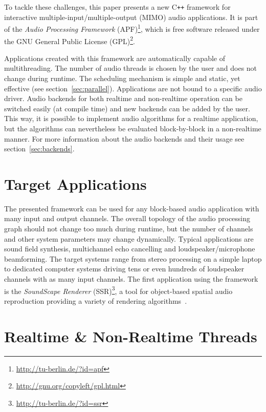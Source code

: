 \documentclass[11pt,letterpaper]{article}
\begin{document}
To tackle these challenges, this paper presents a new C\texttt{++} framework for interactive multiple-input/multiple-output (MIMO)
audio applications.
It is part of the \emph{Audio Processing Framework}
(APF)\footnote{\url{http://tu-berlin.de/?id=apf}}, which is free software
released under the GNU General Public License
(GPL)\footnote{\url{http://gnu.org/copyleft/gpl.html}}.

Applications created with this framework are automatically capable of
multithreading.
The number of audio threads is chosen by the user and does not change during
runtime.
The scheduling mechanism is simple and static, yet effective (see
section~\ref{sec:parallel}).
Applications are not bound to a specific audio driver.
Audio backends for both realtime and non-realtime operation can be switched
easily (at compile time) and new backends can be added by the user.
This way, it is possible to implement audio algorithms for a realtime
application, but the algorithms can nevertheless be evaluated block-by-block in
a non-realtime manner. For more information about the audio backends and their
usage see
section~\ref{sec:backends}.

\section{Target Applications}

The presented framework can be used for any block-based audio application with
many input and output channels.
The overall topology of the audio processing graph should not change too much
during runtime, but the number of channels and other system parameters may
change dynamically.
Typical applications are sound field synthesis, multichannel echo cancelling and
loudspeaker/microphone beamforming.
The target systems range from stereo processing on a simple laptop to dedicated
computer systems driving tens or even hundreds of loudspeaker channels with as
many input channels.
The first application using the framework is the \emph{SoundScape
Renderer} (SSR)\footnote{\url{http://tu-berlin.de/?id=ssr}}, a tool for
object-based spatial audio reproduction providing a variety of rendering
algorithms~\cite{geier2008ssr}.

\section{Realtime \& Non-Realtime Threads}
\end{document}

